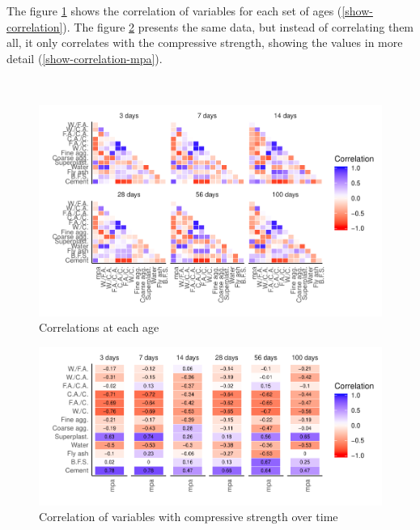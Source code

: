 \documentclass[]{article}
\begin{document}
The figure \ref{fig:correlation} shows the correlation of variables for
each set of ages (\ref{show-correlation}). The figure
\ref{fig:correlation-mpa} presents the same data, but instead of
correlating them all, it only correlates with the compressive strength,
showing the values in more detail (\ref{show-correlation-mpa}).

~

\begin{figure}

{\centering \includegraphics{CopyOfcapstone_files/figure-latex/correlation-1} 

}

\caption{Correlations at each age}\label{fig:correlation}
\end{figure}

\begin{figure}

{\centering \includegraphics{CopyOfcapstone_files/figure-latex/correlation-mpa-1} 

}

\caption{Correlation of variables with compressive strength over time}\label{fig:correlation-mpa}
\end{figure}
\end{document}

